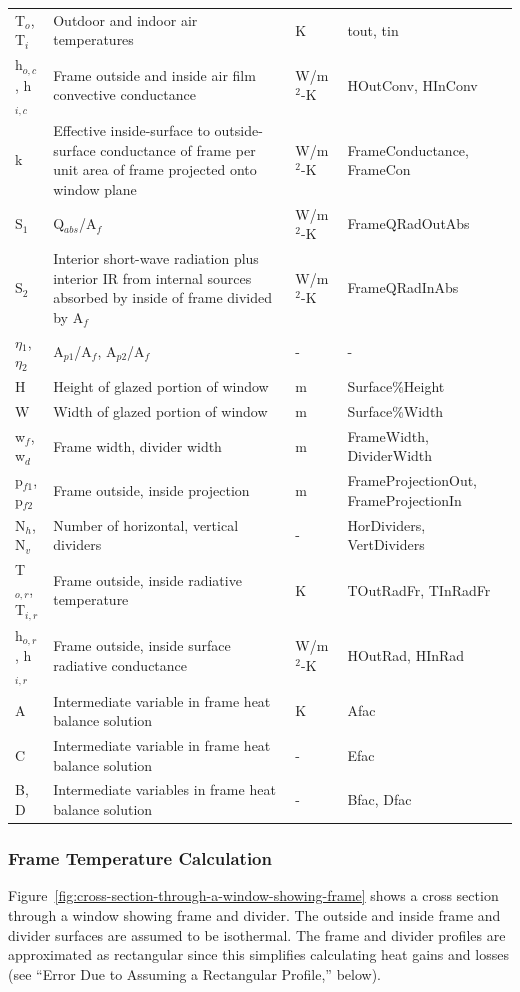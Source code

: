 \begin{longtable}[c]{p{1.0in}p{2.5in}p{1.0in}p{1.5in}}
T\(_{o}\), T\(_{i}\) & Outdoor and indoor air temperatures & K & tout, tin \tabularnewline
h\(_{o,c}\), h\(_{i,c}\) & Frame outside and inside air film convective conductance & W/m\(^{2}\)-K & HOutConv, HInConv \tabularnewline
k & Effective inside-surface to outside-surface conductance of frame per unit area of frame projected onto window plane & W/m\(^{2}\)-K & FrameConductance, FrameCon \tabularnewline
S\(_{1}\) & Q\(_{abs}\)/A\(_{f}\) & W/m\(^{2}\)-K & FrameQRadOutAbs \tabularnewline
S\(_{2}\) & Interior short-wave radiation plus interior IR from internal sources absorbed by inside of frame divided by A\(_{f}\) & W/m\(^{2}\)-K & FrameQRadInAbs \tabularnewline
$\eta$\(_{1}\), $\eta$\(_{2}\) & A\(_{p1}\)/A\(_{f}\), A\(_{p2}\)/A\(_{f}\) & - & - \tabularnewline
H & Height of glazed portion of window & m & Surface\%Height \tabularnewline
W & Width of glazed portion of window & m & Surface\%Width \tabularnewline
w\(_{f}\), w\(_{d}\) & Frame width, divider width & m & FrameWidth, DividerWidth \tabularnewline
p\(_{f1}\), p\(_{f2}\) & Frame outside, inside projection & m & FrameProjectionOut, FrameProjectionIn \tabularnewline
N\(_{h}\), N\(_{v}\) & Number of horizontal, vertical dividers & - & HorDividers, VertDividers \tabularnewline
T\(_{o,r}\), T\(_{i,r}\) & Frame outside, inside radiative temperature & K & TOutRadFr, TInRadFr \tabularnewline
h\(_{o,r}\), h\(_{i,r}\) & Frame outside, inside surface radiative conductance & W/m\(^{2}\)-K & HOutRad, HInRad \tabularnewline
A & Intermediate variable in frame heat balance solution & K & Afac \tabularnewline
C & Intermediate variable in frame heat balance solution & - & Efac \tabularnewline
B, D & Intermediate variables in frame heat balance solution & - & Bfac, Dfac \tabularnewline
\bottomrule
\end{longtable}

\subsubsection{Frame Temperature Calculation}\label{frame-temperature-calculation}

Figure~\ref{fig:cross-section-through-a-window-showing-frame} shows a cross section through a window showing frame and divider. The outside and inside frame and divider surfaces are assumed to be isothermal. The frame and divider profiles are approximated as rectangular since this simplifies calculating heat gains and losses (see ``Error Due to Assuming a Rectangular Profile,'' below).

